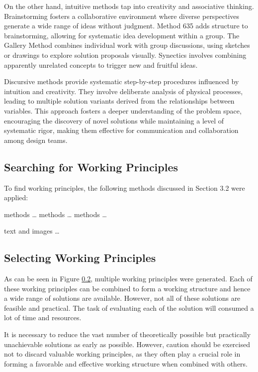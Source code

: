 On the other hand, intuitive methods tap into creativity and associative thinking. Brainstorming fosters a collaborative environment where diverse perspectives generate a wide range of ideas without judgment. Method 635 adds structure to brainstorming, allowing for systematic idea development within a group. The Gallery Method combines individual work with group discussions, using sketches or drawings to explore solution proposals visually. Synectics involves combining apparently unrelated concepts to trigger new and fruitful ideas. \cite{Pahl07h}

Discursive methods provide systematic step-by-step procedures influenced by intuition and creativity. They involve deliberate analysis of physical processes, leading to multiple solution variants derived from the relationships between variables. This approach fosters a deeper understanding of the problem space, encouraging the discovery of novel solutions while maintaining a level of systematic rigor, making them effective for communication and collaboration among design teams. \cite{Pahl07i}

\subsection{Searching for Working Principles}
To find working principles, the following methods discussed in Section 3.2 were
applied:

methods \dots
methods \dots
methods \dots

text and images \dots

\subsection{Selecting Working Principles}

As can be seen in Figure \ref{}, multiple working principles were generated. Each of these working principles can be combined to form a working structure and hence a wide range of solutions are available. However, not all of these solutions are feasible and practical. The task of evaluating each of the solution will consumed a lot of time and resources.


It is necessary to reduce the vast number of theoretically possible but practically unachievable solutions as early as possible. However, caution should be exercised not to discard valuable working principles, as they often play a crucial role in forming a favorable and effective working structure when combined with others.


